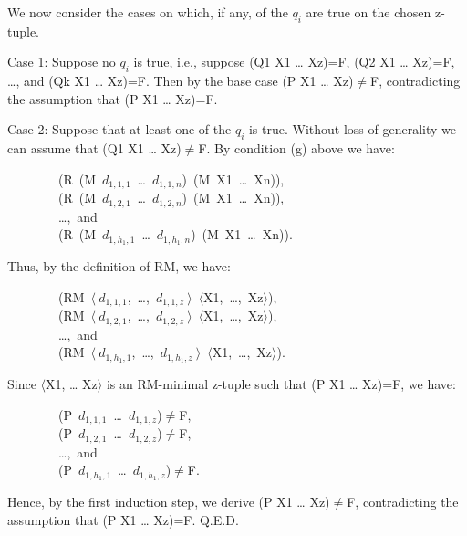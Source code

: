 \documentclass[11pt]{book}
\newenvironment{pubasis}{\begin{flushleft}\ttfamily\small}{\normalsize\rmfamily\end{flushleft}}
\begin{document}
We now consider the cases on which, if any, of the $q_{i}$ are
true on the chosen z-tuple.

Case 1:  Suppose no $q_{i}$ is true, i.e., suppose (Q1 X1 \ldots{} Xz)=F,
(Q2 X1 \ldots{} Xz)=F, \ldots{}, and (Qk X1 \ldots{} Xz)=F.  Then by the base case
(P X1 \ldots{} Xz)$\neq$F, contradicting the assumption that (P X1 \ldots{} Xz)=F.

Case 2:  Suppose that at least one of the $q_{i}$ is true.
Without loss of generality we can assume that (Q1 X1 \ldots{} Xz)$\neq$F.
By condition (g) above we have:
\begin{pubasis}
~~~~~~~~(R~(M~$d_{1,1,1}$~\ldots{}~$d_{1,1,n}$)~(M~X1~\ldots{}~Xn)),\\

~~~~~~~~(R~(M~$d_{1,2,1}$~\ldots{}~$d_{1,2,n}$)~(M~X1~\ldots{}~Xn)),~\\

~~~~~~~~\ldots{},~and\\

~~~~~~~~(R~(M~$d_{1,h_{1},1}$~\ldots{}~$d_{1,h_{1},n}$)~(M~X1~\ldots{}~Xn)).\\
\end{pubasis}
Thus, by the definition of RM, we have:
\begin{pubasis}
~~~~~~~~(RM~$\langle~d_{1,1,1}$,~\ldots{},~$d_{1,1,z}~\rangle$~$\langle$X1,~\ldots{},~Xz$\rangle$),\\

~~~~~~~~(RM~$\langle~d_{1,2,1}$,~\ldots{},~$d_{1,2,z}~\rangle$~$\langle$X1,~\ldots{},~Xz$\rangle$),\\

~~~~~~~~\ldots{},~and\\

~~~~~~~~(RM~$\langle~d_{1,h_{1},1}$,~\ldots{},~$d_{1,h_{1},z}~\rangle$~$\langle$X1,~\ldots{},~Xz$\rangle$).\\
\end{pubasis}
Since $\langle$X1, \ldots{} Xz$\rangle$ is an RM-minimal z-tuple such that (P X1 \ldots{} Xz)=F,
we have:
\begin{pubasis}
~~~~~~~~(P~$d_{1,1,1}$~\ldots{}~$d_{1,1,z}$)$\neq$F,\\

~~~~~~~~(P~$d_{1,2,1}$~\ldots{}~$d_{1,2,z}$)$\neq$F,\\

~~~~~~~~\ldots{},~and\\

~~~~~~~~(P~$d_{1,h_{1},1}$~\ldots{}~$d_{1,h_{1},z}$)$\neq$F.\\
\end{pubasis}
Hence, by the first induction
step, we derive (P X1 \ldots{} Xz)$\neq$F, contradicting the assumption that
(P X1 \ldots{} Xz)=F.  Q.E.D.
\end{document}
